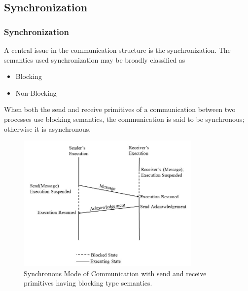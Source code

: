 \documentclass{beamer}
\begin{document}
\subsection{Synchronization}
\begin{frame}[allowframebreaks]
	\frametitle{Synchronization}
	A central issue in the communication structure is the synchronization. The semantics
	used synchronization may be broadly classified as
	\begin{itemize}
		\item Blocking
		\item Non-Blocking
	\end{itemize}
	When both the send and receive primitives of a communication between two processes use
	blocking semantics, the communication is said to be synchronous; otherwise it is
	asynchronous.
	\vspace{2cm}
	\framebreak
	\begin{figure}
		\centering
		\includegraphics[width=9cm]{synchronousMode.jpg}
		\caption{Synchronous Mode of Communication with send and receive primitives having
		blocking type semantics.}
	\end{figure}
\end{frame}
\end{document}
